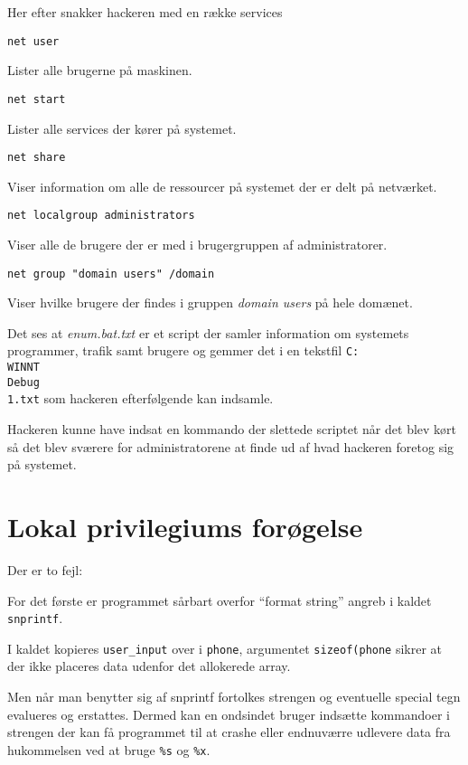 \documentclass[10pt,a4paper,danish]{article}
\begin{document}
Her efter snakker hackeren med en række services

\begin{verbatim}
net user
\end{verbatim}
Lister alle brugerne på maskinen.

\begin{verbatim}
net start
\end{verbatim}
Lister alle services der kører på systemet.

\begin{verbatim}
net share
\end{verbatim}
Viser information om alle de ressourcer på systemet der er delt på netværket.

\begin{verbatim}
net localgroup administrators
\end{verbatim}
Viser alle de brugere der er med i brugergruppen af administratorer.

\begin{verbatim}
net group "domain users" /domain
\end{verbatim}
Viser hvilke brugere der findes i gruppen \textit{domain users} på hele domænet.


Det ses at \textit{enum.bat.txt} er et script der samler information om
systemets programmer, trafik samt brugere og gemmer det i en tekstfil \texttt{C:\\WINNT\\Debug\\1.txt} som
hackeren efterfølgende kan indsamle.

Hackeren kunne have indsat en kommando der slettede scriptet når det blev kørt
så det blev sværere for administratorene at finde ud af hvad hackeren foretog
sig på systemet.

\section{Lokal privilegiums forøgelse}

Der er to fejl:

For det første er programmet sårbart overfor ``format string'' angreb i kaldet
\texttt{snprintf}.

I kaldet kopieres \texttt{user\_input} over i \texttt{phone}, argumentet
\texttt{sizeof(phone} sikrer at der ikke placeres data udenfor det allokerede
array.

Men når man benytter sig af snprintf fortolkes strengen og eventuelle special
tegn evalueres og erstattes. Dermed kan en ondsindet bruger indsætte kommandoer
i strengen der kan få programmet til at crashe eller endnuværre udlevere data
fra hukommelsen ved at bruge \texttt{\%s} og \texttt{\%x}.
\end{document}
